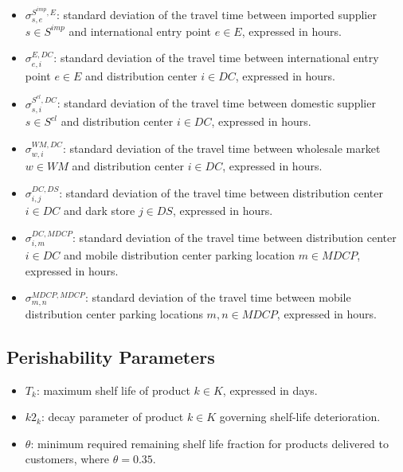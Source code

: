\documentclass[12pt]{article}
\begin{document}
\begin{itemize}
    \item $\sigma^{S^{imp},E}_{s,e}$: standard deviation of the travel time between imported supplier $s \in S^{imp}$ and international entry point $e \in E$, expressed in hours.

    \item $\sigma^{E,DC}_{e,i}$: standard deviation of the travel time between international entry point $e \in E$ and distribution center $i \in DC$, expressed in hours.

    \item $\sigma^{S^{cl},DC}_{s,i}$: standard deviation of the travel time between domestic supplier $s \in S^{cl}$ and distribution center $i \in DC$, expressed in hours.

    \item $\sigma^{WM,DC}_{w,i}$: standard deviation of the travel time between wholesale market $w \in WM$ and distribution center $i \in DC$, expressed in hours.

    \item $\sigma^{DC,DS}_{i,j}$: standard deviation of the travel time between distribution center $i \in DC$ and dark store $j \in DS$, expressed in hours.

    \item $\sigma^{DC,MDCP}_{i,m}$: standard deviation of the travel time between distribution center $i \in DC$ and mobile distribution center parking location $m \in MDCP$, expressed in hours.

    \item $\sigma^{MDCP,MDCP}_{m,n}$: standard deviation of the travel time between mobile distribution center parking locations $m,n \in MDCP$, expressed in hours.
\end{itemize}

\subsection{Perishability Parameters}

\begin{itemize}
    \item $T_k$: maximum shelf life of product $k \in K$, expressed in days.

    \item $k2_k$: decay parameter of product $k \in K$ governing shelf-life deterioration.

    \item $\theta$: minimum required remaining shelf life fraction for products delivered to customers, where $\theta = 0.35$.
\end{itemize}
\end{document}
